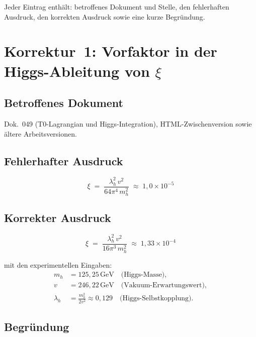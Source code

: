 Jeder Eintrag enthält: betroffenes Dokument und Stelle, den fehlerhaften
Ausdruck, den korrekten Ausdruck sowie eine kurze Begründung.

\section{\texorpdfstring{Korrektur~1: Vorfaktor in der Higgs-Ableitung von $\xi$}{Korrektur 1: Vorfaktor in der Higgs-Ableitung von xi}}

\subsection*{Betroffenes Dokument}

Dok.~049 (T0-Lagrangian und Higgs-Integration), HTML-Zwischenversion
sowie ältere Arbeitsversionen.

\subsection*{Fehlerhafter Ausdruck}

\begin{equation}
  \xi \;=\; \frac{\lambda_h^2\, v^2}{64\pi^4\, m_h^2}
  \;\approx\; 1{,}0 \times 10^{-5}
  \tag{alt -- falsch}
\end{equation}

\subsection*{Korrekter Ausdruck}

\begin{equation}
  \boxed{
    \xi \;=\; \frac{\lambda_h^2\, v^2}{16\pi^3\, m_h^2}
    \;\approx\; 1{,}33 \times 10^{-4}
  }
  \tag{190.1}
\end{equation}

mit den experimentellen Eingaben:
\begin{align*}
  m_h      &= 125{,}25\,\text{GeV} \quad \text{(Higgs-Masse)}, \\
  v        &= 246{,}22\,\text{GeV} \quad \text{(Vakuum-Erwartungswert)}, \\
  \lambda_h &= \frac{m_h^2}{2v^2} \approx 0{,}129
               \quad \text{(Higgs-Selbstkopplung)}.
\end{align*}

\subsection*{Begründung}


